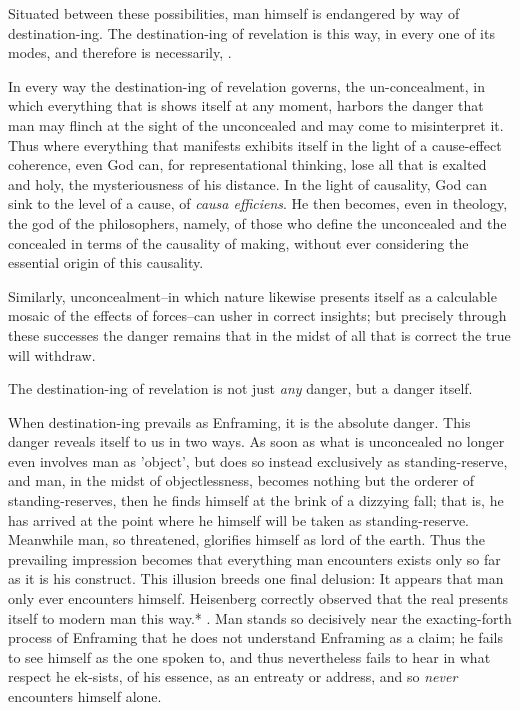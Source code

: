 \documentclass[12pt]{article}
\begin{document}
Situated between these possibilities, man himself is endangered by way of destination-ing. The destination-ing of revelation is this way, in every one of its modes, and therefore is necessarily, .

In every way the destination-ing of revelation governs, the un-concealment, in which everything that is shows itself at any moment, harbors the danger that man may flinch at the sight of the unconcealed and may come to misinterpret it. Thus where everything that manifests exhibits itself in the light of a cause-effect coherence, even God can, for representational thinking, lose all that is exalted and holy, the mysteriousness of his distance. In the light of causality, God can sink to the level of a cause, of \textit{causa efficiens}. He then becomes, even in theology, the god of the philosophers, namely, of those who define the unconcealed and the concealed in terms of the causality of making, without ever considering the essential origin of this causality.

Similarly, unconcealment--in which nature likewise presents itself as a calculable mosaic of the effects of forces--can usher in correct insights; but precisely through these successes the danger remains that in the midst of all that is correct the true will withdraw.

The destination-ing of revelation is not just \textit{any} danger, but a danger itself.

When destination-ing prevails as Enframing, it is the absolute danger. This danger reveals itself to us in two ways. As soon as what is unconcealed no longer even involves man as 'object', but does so instead exclusively as standing-reserve, and man, in the midst of objectlessness, becomes nothing but the orderer of standing-reserves, then he finds himself at the brink of a dizzying fall; that is, he has arrived at the point where he himself will be taken as standing-reserve. Meanwhile man, so threatened, glorifies himself as lord of the earth. Thus the prevailing impression becomes that everything man encounters exists only so far as it is his construct. This illusion breeds one final delusion: It appears that man only ever encounters himself. Heisenberg correctly observed that the real presents itself to modern man this way.* . Man stands so decisively near the exacting-forth process of Enframing that he does not understand Enframing as a claim; he fails to see himself as the one spoken to, and thus nevertheless fails to hear in what respect he ek-sists, of his essence, as an entreaty or address, and so \textit{never} encounters himself alone.
\end{document}
